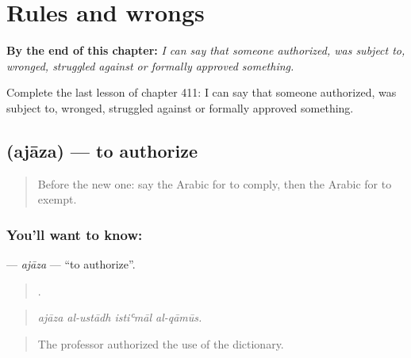 
\chapter{Rules and wrongs}
\label{ch:ar-rules-and-wrongs}

\begin{chapteropening}
\textbf{By the end of this chapter:} \emph{I can say that someone authorized, was subject to, wronged, struggled against or formally approved something.}

Complete the last lesson of chapter 411: I can say that someone authorized, was subject to, wronged, struggled against or formally approved something.
\end{chapteropening}

\section[\texorpdfstring{\ar{أجاز} (ajāza)}{أجاز (ajāza)}]{ (ajāza) — to authorize}

\label{lesson:AR-C411-ajaza}



\begin{quote}
Before the new one: say the Arabic for to comply, then the Arabic for to exempt.
\end{quote}

\subsection*{You'll want to know: }
\textbf{} — \emph{ajāza} — \textquotedblleft{}to authorize\textquotedblright{}.

\begin{quote}
   .
\end{quote}

\begin{quote}
\emph{ajāza al-ustādh istiʿmāl al-qāmūs.}
\end{quote}

\begin{quote}
The professor authorized the use of the dictionary.
\end{quote}

